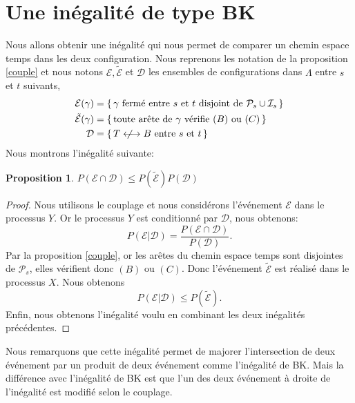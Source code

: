 \documentclass[titlepage,a4paper,12pt]{article}
\newcounter{th}
\newcounter{propo}
\newtheorem{prop}[propo]{Proposition}
\newcommand{\nlongleftrightarrow}{\longleftrightarrow \kern-15pt\not \kern15pt}
\begin{document}
\section{Une inégalité de type BK}
Nous allons obtenir une inégalité qui nous permet de comparer un chemin espace temps dans les deux configuration. Nous reprenons les notation de la proposition \ref{couple} et nous notons $\mathcal{E},\tilde{\mathcal{E}}$ et $\mathcal{D}$ les ensembles de configurations dans $\Lambda$ entre $s$ et $t$ suivants,
\begin{align*}
\mathcal{E}(\gamma)&=\{\,\gamma \text{ fermé entre }s \text{ et }t\text{ disjoint de }\mathcal{P}_s\cup \mathcal{I}_s\,\}\\
\tilde{\mathcal{E}}(\gamma)&=\{\,\text{toute arête de }\gamma\text{ vérifie } (B)\text{ ou }(C) \,\}\\
\mathcal{D}& = \{\,T\nlongleftrightarrow B \text{ entre }s \text{ et }t\,\}
\end{align*}
Nous montrons l'inégalité suivante:
\begin{prop} \label{BK'}
$P(\mathcal{E}\cap\mathcal{D})\leqslant P(\tilde{\mathcal{E}})P(\mathcal{D})$
\end{prop}
\begin{proof}
Nous utilisons le couplage et nous considérons l'événement $\mathcal{E}$ dans le processus $Y$. Or le processus $Y$ est conditionné par $\mathcal{D}$, nous obtenons:
$$P(\mathcal{E}|\mathcal{D}) = \frac{P(\mathcal{E}\cap\mathcal{D})}{P(\mathcal{D})}.
$$
Par la proposition \ref{couple}, or les arêtes du chemin espace temps sont disjointes de $\mathcal{P}_s$, elles vérifient donc $(B)$ ou $(C)$. Donc l'événement $\tilde{\mathcal{E}}$ est réalisé dans le processus $X$. Nous obtenons
$$ P(\mathcal{E}|\mathcal{D})\leqslant P(\tilde{\mathcal{E}}).
$$
Enfin, nous obtenons l'inégalité voulu en combinant les deux inégalités précédentes.
\end{proof}
Nous remarquons que cette inégalité permet de majorer l'intersection de deux événement par un produit de deux événement comme l'inégalité de BK. Mais la différence avec l'inégalité de BK est que l'un des deux événement à droite de l'inégalité est modifié selon le couplage. 
\end{document}
